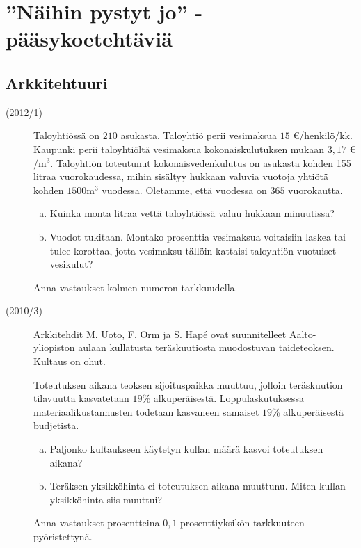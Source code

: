 \chapter{''Näihin pystyt jo'' -pääsykoetehtäviä}

\section{Arkkitehtuuri}

\begin{description}
    \item[(2012/1)] Taloyhtiössä on $210$ asukasta. Taloyhtiö perii vesimaksua
        $15$ \euro/henkilö/kk. Kaupunki perii taloyhtiöltä vesimaksua
        kokonaiskulutuksen mukaan $3,17$ \euro $/ \mathrm{m}^3$.
        Taloyhtiön toteutunut kokonaisvedenkulutus on asukasta kohden
        155 litraa vuorokaudessa, mihin sisältyy hukkaan valuvia
        vuotoja yhtiötä kohden $1500 \mathrm{m}^3$ vuodessa. Oletamme,
        että vuodessa on $365$ vuorokautta.
                    
    \begin{enumerate}[(a)]
        \item Kuinka monta litraa vettä taloyhtiössä valuu hukkaan minuutissa?
        \item Vuodot tukitaan. Montako prosenttia vesimaksua voitaisiin laskea
            tai tulee korottaa, jotta vesimaksu tällöin kattaisi taloyhtiön
            vuotuiset vesikulut?
    \end{enumerate}
    
    Anna vastaukset kolmen numeron tarkkuudella.
\end{description}


\begin{description}
    \item[(2010/3)] Arkkitehdit M. Uoto, F. Örm ja S. Hapé ovat suunnitelleet Aalto-yliopiston aulaan kullatusta teräskuutiosta muodostuvan taideteoksen. Kultaus on ohut.
    
    Toteutuksen aikana teoksen sijoituspaikka muuttuu, jolloin teräskuution tilavuutta kasvatetaan $19$\% alkuperäisestä. Loppulaskutuksessa materiaalikustannusten todetaan kasvaneen samaiset $19$\% alkuperäisestä budjetista.                   
    \begin{enumerate}[(a)]
        \item Paljonko kultaukseen käytetyn kullan määrä kasvoi toteutuksen aikana?
        \item Teräksen yksikköhinta ei toteutuksen aikana muuttunu. Miten kullan yksikköhinta siis muuttui?
    \end{enumerate}
    
    Anna vastaukset prosentteina $0,1$ prosenttiyksikön tarkkuuteen pyöristettynä.
\end{description}

